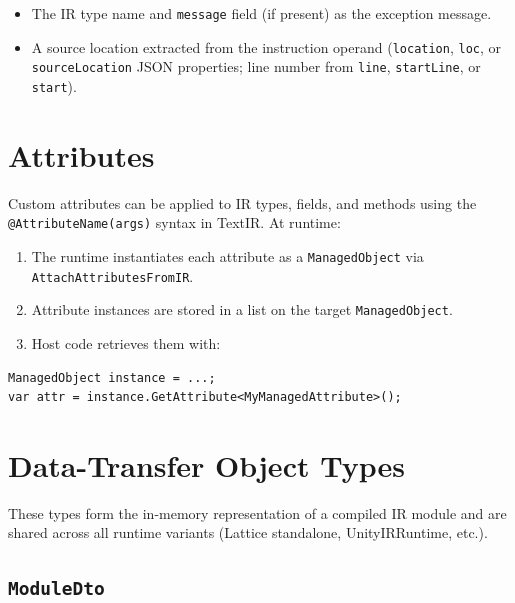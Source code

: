 \documentclass[11pt,a4paper]{article}
\newcommand{\code}[1]{\texttt{\small #1}}
\newcommand{\typename}[1]{\textcolor{typecolor}{\texttt{\small #1}}}
\begin{document}
\begin{itemize}[leftmargin=1.8em, noitemsep]
  \item The IR type name and \code{message} field (if present) as the
    exception message.
  \item A source location extracted from the instruction operand
    (\texttt{location}, \texttt{loc}, or \texttt{sourceLocation} JSON
    properties; line number from \texttt{line}, \texttt{startLine}, or
    \texttt{start}).
\end{itemize}

\section{Attributes}
\label{sec:attributes}

Custom attributes can be applied to IR types, fields, and methods using the
\texttt{@AttributeName(args)} syntax in TextIR. At runtime:

\begin{enumerate}[leftmargin=2em]
  \item The runtime instantiates each attribute as a \typename{ManagedObject}
    via \code{AttachAttributesFromIR}.
  \item Attribute instances are stored in a list on the target
    \typename{ManagedObject}.
  \item Host code retrieves them with:
\end{enumerate}

\begin{lstlisting}[style=cs]
ManagedObject instance = ...;
var attr = instance.GetAttribute<MyManagedAttribute>();
\end{lstlisting}

\section{Data-Transfer Object Types}
\label{sec:dto}

These types form the in-memory representation of a compiled IR module and are
shared across all runtime variants (Lattice standalone, UnityIRRuntime, etc.).

\subsection{\texttt{ModuleDto}}
\end{document}
